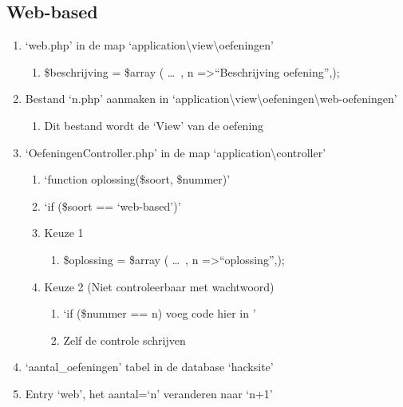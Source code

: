 \subsection{Web-based} 
\begin{enumerate}
\item `web.php' in de map `application\textbackslash view\textbackslash oefeningen'
	\begin{enumerate}
	\item \$beschrijving = \$array ( \ldots ~, n =\textgreater ``Beschrijving oefening'',);
	\end{enumerate}
\item Bestand `n.php' aanmaken in `application\textbackslash view\textbackslash oefeningen\textbackslash web-oefeningen'
	\begin{enumerate}
	\item Dit bestand wordt de `View' van de oefening
	\end{enumerate}
\item `OefeningenController.php' in de map `application\textbackslash controller'
	\begin{enumerate}
	\item `function oplossing(\$soort, \$nummer)'
	\item `if (\$soort == `web-based')'
	\item Keuze 1
		\begin{enumerate}
		\item \$oplossing = \$array ( \ldots ~, n =\textgreater ``oplossing'',);
		\end{enumerate}
	\item Keuze 2 (Niet controleerbaar met wachtwoord)
		\begin{enumerate}
		\item `if (\$nummer == n) { voeg code hier in }'
		\item Zelf de controle schrijven
		\end{enumerate}
	\end{enumerate}
\item `aantal\_oefeningen' tabel in de database `hacksite'
\item Entry `web', het aantal=`n' veranderen naar `n+1'
\end{enumerate}



